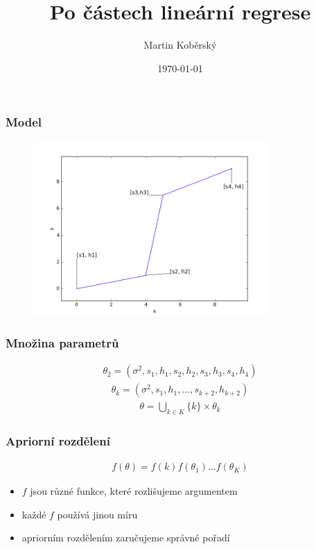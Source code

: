 \documentclass{beamer}
\author{Martin Koběrský} %
\title{Po částech lineární regrese} %
\date{\today} %
\institute{Katedra aplikované matematiky, VŠB -- TU Ostrava} %
\begin{document}
\begin{frame}
\titlepage
\end{frame}

\begin{frame}
\frametitle{Model}
\begin{figure}
	[H]\centering\includegraphics[width=0.8\textwidth]{images/model2.png}
\end{figure}
\end{frame}

\begin{frame}
\frametitle{Množina parametrů}
  \begin{align*}
	  \theta_2 = (\sigma^2, s_1, h_1, s_2, h_2, s_3, h_3, s_4, h_4)
  \end{align*}
  \begin{align*}
  	   \theta_k = (\sigma^2, s_1, h_1, ..., s_{k+2}, h_{k+2})
  \end{align*}
  \begin{align*}
  		\theta = \bigcup_{k \in K}  \{ k \} \times \theta_k
  \end{align*}
\end{frame}

\begin{frame}
\frametitle{Apriorní rozdělení}
\begin{align*}
    f(\theta) = f(k)f(\theta_1)...f(\theta_K)
\end{align*}
\begin{itemize}
	\item $f$ jsou různé funkce, které rozlišujeme argumentem
	\item každé $f$ používá jinou míru
	\item apriorním rozdělením zaručujeme správné pořadí
\end{itemize}
\end{frame}
\end{document}
